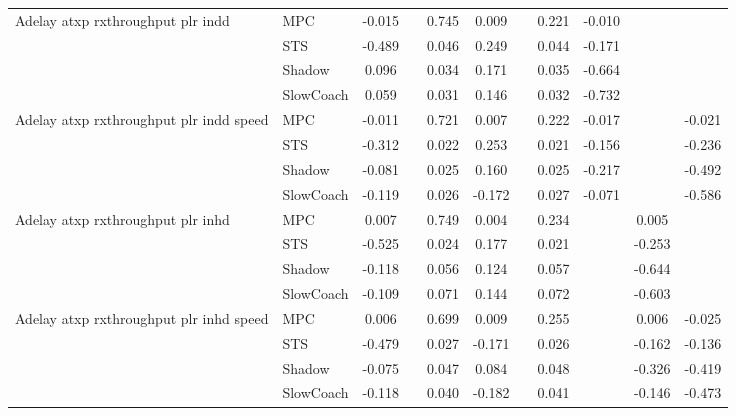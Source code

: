 \begin{tabular}{|l|l|*{9}{c|}}
\midrule
Adelay atxp rxthroughput plr indd    & MPC &   -0.015 &        &     0.745 &  0.009 &     &  0.221 &  -0.010 &      &       \\
                              & STS &   -0.489 &        &     0.046 &  0.249 &     &  0.044 &  -0.171 &      &       \\
                              & Shadow &    0.096 &        &     0.034 &  0.171 &     &  0.035 &  -0.664 &      &       \\
                              & SlowCoach &    0.059 &        &     0.031 &  0.146 &     &  0.032 &  -0.732 &      &       \\
\midrule
Adelay atxp rxthroughput plr indd speed    & MPC &   -0.011 &        &     0.721 &  0.007 &     &  0.222 &  -0.017 &      &   -0.021 \\
                              & STS &   -0.312 &        &     0.022 &  0.253 &     &  0.021 &  -0.156 &      &   -0.236 \\
                              & Shadow &   -0.081 &        &     0.025 &  0.160 &     &  0.025 &  -0.217 &      &   -0.492 \\
                              & SlowCoach &   -0.119 &        &     0.026 & -0.172 &     &  0.027 &  -0.071 &      &   -0.586 \\
\midrule
Adelay atxp rxthroughput plr inhd    & MPC &    0.007 &        &     0.749 &  0.004 &     &  0.234 &      &   0.005 &       \\
                              & STS &   -0.525 &        &     0.024 &  0.177 &     &  0.021 &      &  -0.253 &       \\
                              & Shadow &   -0.118 &        &     0.056 &  0.124 &     &  0.057 &      &  -0.644 &       \\
                              & SlowCoach &   -0.109 &        &     0.071 &  0.144 &     &  0.072 &      &  -0.603 &       \\
\midrule
Adelay atxp rxthroughput plr inhd speed    & MPC &    0.006 &        &     0.699 &  0.009 &     &  0.255 &      &   0.006 &   -0.025 \\
                              & STS &   -0.479 &        &     0.027 & -0.171 &     &  0.026 &      &  -0.162 &   -0.136 \\
                              & Shadow &   -0.075 &        &     0.047 &  0.084 &     &  0.048 &      &  -0.326 &   -0.419 \\
                              & SlowCoach &   -0.118 &        &     0.040 & -0.182 &     &  0.041 &      &  -0.146 &   -0.473 \\

\end{tabular}
